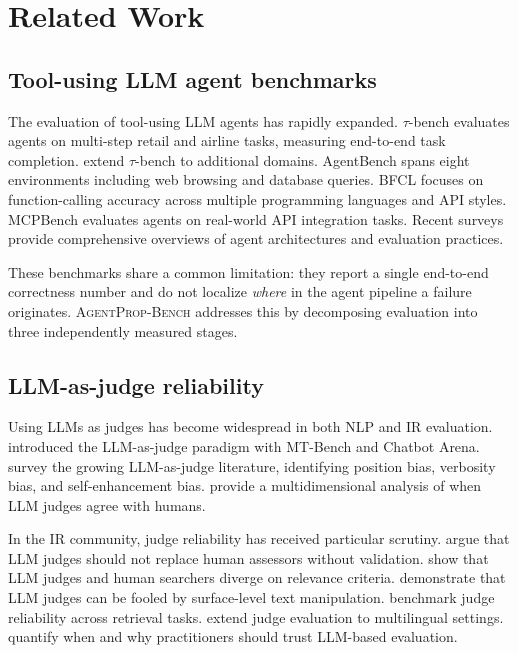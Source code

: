 \documentclass[preprint,review,12pt,3p]{elsarticle}
\newcommand{\bench}{\textsc{AgentProp-Bench}\xspace}
\begin{document}
\section{Related Work}
\label{sec:related}

\subsection{Tool-using LLM agent benchmarks}

The evaluation of tool-using LLM agents has rapidly expanded.
$\tau$-bench \citep{yao2024tau} evaluates agents on multi-step retail
and airline tasks, measuring end-to-end task completion.
\citet{barres2025tau2} extend $\tau$-bench to additional domains.
AgentBench \citep{liu2024agentbench} spans eight environments including
web browsing and database queries.
BFCL \citep{yan2025bfcl} focuses on function-calling accuracy across
multiple programming languages and API styles.
MCPBench \citep{mcpagentbench2026} evaluates agents on real-world API
integration tasks.
Recent surveys \citep{yehudai2025surveyeval,xie2025agentir} provide
comprehensive overviews of agent architectures and evaluation practices.

These benchmarks share a common limitation: they report a single
end-to-end correctness number and do not localize \emph{where} in the
agent pipeline a failure originates.
\bench{} addresses this by decomposing evaluation into three
independently measured stages.

\subsection{LLM-as-judge reliability}

Using LLMs as judges has become widespread in both NLP and IR evaluation.
\citet{zheng2023judging} introduced the LLM-as-judge paradigm with
MT-Bench and Chatbot Arena.
\citet{gu2024surveyjudge} survey the growing LLM-as-judge literature,
identifying position bias, verbosity bias, and self-enhancement bias.
\citet{bavaresco2024llmsjudges} provide a multidimensional analysis of
when LLM judges agree with humans.

In the IR community, judge reliability has received particular scrutiny.
\citet{soboroff2024dont} argue that LLM judges should not replace human
assessors without validation.
\citet{thomas2024searcher} show that LLM judges and human searchers
diverge on relevance criteria.
\citet{alaofi2024fooled} demonstrate that LLM judges can be fooled by
surface-level text manipulation.
\citet{thakur2025judging} benchmark judge reliability across retrieval
tasks.
\citet{fu2025multilingual} extend judge evaluation to multilingual
settings.
\citet{schroeder2024trust} quantify when and why practitioners should
trust LLM-based evaluation.
\end{document}
